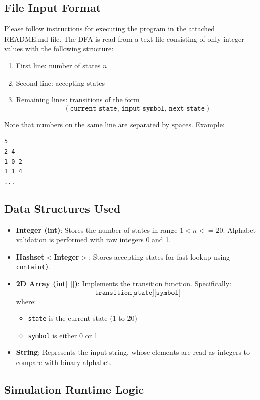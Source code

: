 \documentclass[11pt]{article}
\begin{document}
\newpage
\subsection*{File Input Format}

Please follow instructions for executing the program in the attached README.md file. The DFA is read from a text file consisting of only integer values with the following structure:
\begin{enumerate}
    \item First line: number of states $n$
    \item Second line: accepting states
    \item Remaining lines: transitions of the form
    \[
    (\texttt{current state, input symbol, next state})
    \]
\end{enumerate}
Note that numbers on the same line are separated by spaces.
Example:
\begin{verbatim}
5
2 4
1 0 2
1 1 4
...
\end{verbatim}

\subsection*{Data Structures Used}

\begin{itemize}
    \item \textbf{Integer (int)}: Stores the number of states in range $1 < n <= 20$. Alphabet validation is performed with raw integers 0 and 1.
    \item \textbf{Hashset$<$Integer$>$}: Stores accepting states for fast lookup using \texttt{contain()}.
    \item \textbf{2D Array (int[][])}: Implements the transition function.
    Specifically:
    \[
    \texttt{transition[state][symbol]}
    \]
    where:
    \begin{itemize}
        \item \texttt{state} is the current state (1 to 20)
        \item \texttt{symbol} is either 0 or 1
    \end{itemize}
    \item \textbf{String}: Represents the input string, whose elements are read as integers to compare with binary alphabet.
\end{itemize}

\subsection*{Simulation Runtime Logic}
\end{document}

